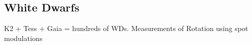 {\color{red} \subsection{White Dwarfs}}
K2 + Tess + Gaia = hundreds of WDs. Measurements of Rotation using spot modulations